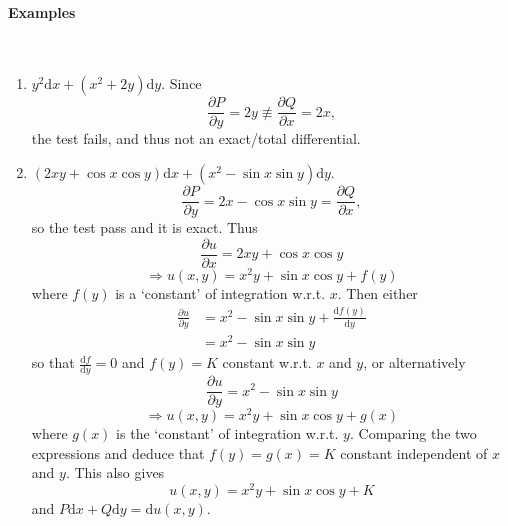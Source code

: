 \documentclass[12pt]{report}
\theoremstyle{definition}
\begin{document}
\paragraph{Examples}
\,

\begin{enumerate}[label = (\roman*)]
    \item $y^{2}\mathrm{d}x + (x^{2}+2y)\mathrm{d}y$.
        Since\[
            \frac{\partial P}{\partial y} = 2y
            \not\equiv \frac{\partial Q}{\partial x} = 2x,
        \]the test fails, and thus not an exact/total differential.

    \item $(2xy + \cos{x}\cos{y})\mathrm{d}x + (x^{2}-\sin{x}\sin{y})\mathrm{d}y$.
        \[
            \frac{\partial P}{\partial y} = 2x - \cos{x}\sin{y} = \frac{\partial Q}{\partial x},
        \]so the test pass and it is exact. Thus\[
        \frac{\partial u}{\partial x} = 2xy + \cos{x}\cos{y}
        \]\[
        \Rightarrow{}u(x,y) = x^{2}y + \sin{x}\cos{y} + f(y)
    \]where $f(y)$ is a `constant' of integration w.r.t. $x$.
    Then either\[
        \begin{align*}
            \frac{\partial u}{\partial y} 
            & = x^{2} - \sin{x}\sin{y} + \frac{\mathrm{d}f(y)}{\mathrm{d}y} \\
            & = x^{2} - \sin{x}\sin{y}
        \end{align*}
    \]so that $\frac{\mathrm{d}f}{\mathrm{d}y} = 0$ and $f(y) = K$ constant w.r.t. $x$ and $y$,
    or alternatively\[
        \frac{\partial u}{\partial y} = x^{2}-\sin{x}\sin{y}
    \]\[
    \Rightarrow{}u(x,y) = x^{2}y + \sin{x}\cos{y} + g(x)
\]where $g(x)$ is the `constant' of integration w.r.t. $y$.
Comparing the two expressions and deduce that $f(y) = g(x) = K$ constant
independent of $x$ and $y$. This also gives\[
    u(x,y) = x^{2}y + \sin{x}\cos{y} + K
\]and $P\mathrm{d}x + Q\mathrm{d}y = \mathrm{d}u(x,y)$.
\end{enumerate}
\end{document}
